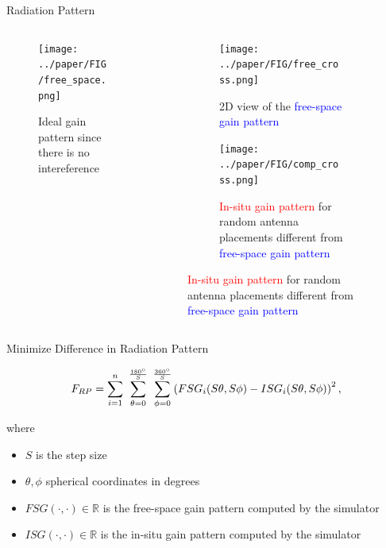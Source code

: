 \documentclass{beamer}
\begin{document}
\begin{frame}{Radiation Pattern}
    \begin{columns}
        \begin{column}{0.5\linewidth}
            \begin{figure}
                \vspace{-2.5cm}
                \centering
                \texttt{[image: ../paper/FIG/free\_space.png]}
                \caption*{\tiny{Ideal gain pattern since there is no intereference}}
            \end{figure}
        \end{column}
        \begin{column}{0.5\linewidth}
            \begin{overlayarea}{\textwidth}{\textheight}
            \begin{figure}
                \begin{subfigure}{\columnwidth}
                \centering
                \texttt{[image: ../paper/FIG/free\_cross.png]}
                \caption*{\tiny {2D view of the \textcolor{blue}{free-space gain pattern}}}%
            \end{subfigure}\vspace*{2mm}
            \begin{subfigure}{\columnwidth}
                \centering
                \texttt{[image: ../paper/FIG/comp\_cross.png]}
                \caption*{\tiny {\textcolor{red}{In-situ gain pattern} for random antenna placements different from \textcolor{blue}{free-space gain pattern}}}%
            \end{subfigure}
            \end{figure}
    \end{overlayarea}
        \end{column}
    \end{columns}
\end{frame}



\begin{frame}{Minimize Difference in Radiation Pattern}
    \begin{tcolorbox}[colback=green!5]
        \begin{equation} \label{eq:rp}
            F_{RP} = \sum_{i=1}^n~\sum_{\theta=0}^{\frac{180\degree}{S}}~\sum_{\phi=0}^{\frac{360\degree}{S}}
            \left( FSG_i(S\theta,S\phi) - ISG_i(S\theta,S\phi) \right) ^2,
        \end{equation}
    \end{tcolorbox}
    where
    \begin{itemize}
            \small
        \item $S$ is the step size
        \item $\theta, \phi$ spherical coordinates in degrees
        \item $FSG(\cdot,\cdot) \in \mathbb R$ is the free-space gain pattern computed by the simulator
        \item $ISG(\cdot,\cdot) \in \mathbb R$ is the in-situ gain pattern computed by the simulator
    \end{itemize}
\end{frame}
\end{document}
